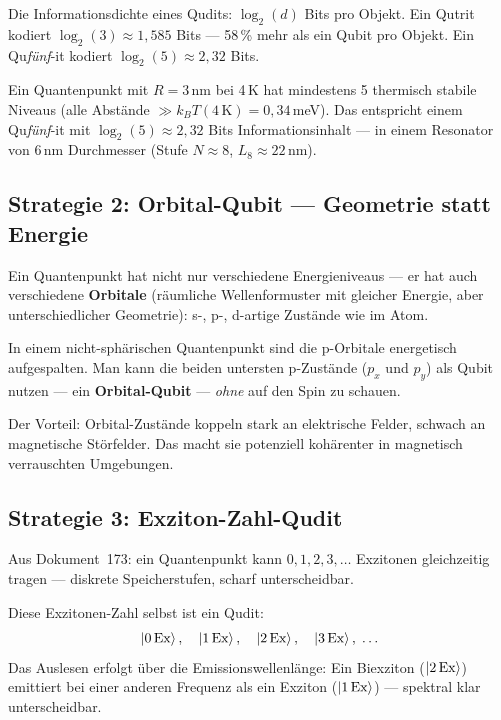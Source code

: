 Die Informationsdichte eines Qudits:
$\log_2(d)$ Bits pro Objekt.
Ein Qutrit kodiert $\log_2(3) \approx 1{,}585$ Bits ---
58\,\% mehr als ein Qubit pro Objekt.
Ein Qu\textit{fünf}-it kodiert $\log_2(5) \approx 2{,}32$ Bits.

\begin{keyresult}
Ein Quantenpunkt mit $R = 3$\,nm bei 4\,K
hat mindestens 5 thermisch stabile Niveaus
(alle Abstände $\gg k_BT(4\,\text{K}) = 0{,}34$\,meV).
Das entspricht einem Qu\textit{fünf}-it mit
$\log_2(5) \approx 2{,}32$ Bits Informationsinhalt ---
in einem Resonator von 6\,nm Durchmesser (Stufe $N \approx 8$, $L_8 \approx 22$\,nm).
\end{keyresult}

\subsection{Strategie 2: Orbital-Qubit --- Geometrie statt Energie}
\label{sec:orbital}

Ein Quantenpunkt hat nicht nur verschiedene Energieniveaus ---
er hat auch verschiedene \textbf{Orbitale} (räumliche
Wellenformuster mit gleicher Energie, aber unterschiedlicher
Geometrie): s-, p-, d-artige Zustände wie im Atom.

In einem nicht-sphärischen Quantenpunkt sind die
p-Orbitale energetisch aufgespalten.
Man kann die beiden untersten p-Zustände ($p_x$ und $p_y$)
als Qubit nutzen --- ein \textbf{Orbital-Qubit} ---
\emph{ohne} auf den Spin zu schauen.

Der Vorteil: Orbital-Zustände koppeln stark an elektrische
Felder, schwach an magnetische Störfelder.
Das macht sie potenziell kohärenter in magnetisch
verrauschten Umgebungen.

\subsection{Strategie 3: Exziton-Zahl-Qudit}
\label{sec:exziton-qudit}

Aus Dokument~173: ein Quantenpunkt kann $0, 1, 2, 3, \ldots$
Exzitonen gleichzeitig tragen --- diskrete Speicherstufen,
scharf unterscheidbar.

Diese Exzitonen-Zahl selbst ist ein Qudit:
\[
  \left|0\,\text{Ex}\right\rangle,\quad
  \left|1\,\text{Ex}\right\rangle,\quad
  \left|2\,\text{Ex}\right\rangle,\quad
  \left|3\,\text{Ex}\right\rangle,\;\ldots
\]
Das Auslesen erfolgt über die Emissionswellenlänge:
Ein Biexziton ($\left|2\,\text{Ex}\right\rangle$) emittiert bei einer
anderen Frequenz als ein Exziton ($\left|1\,\text{Ex}\right\rangle$)
--- spektral klar unterscheidbar.

